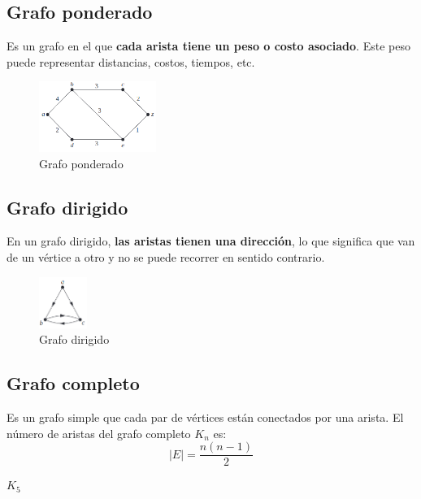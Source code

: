 \documentclass{article}
\begin{document}
\newpage

\subsection{Grafo ponderado}
Es un grafo en el que \textbf{cada arista tiene un peso o costo asociado}. Este peso puede representar distancias, costos, tiempos, etc.

\begin{figure}[h]
    \centering
    \includegraphics[width=0.34\textwidth]{img-t4/img_168_10.png}
    \caption{Grafo ponderado}
\end{figure}

\subsection{Grafo dirigido}
En un grafo dirigido, \textbf{las aristas tienen una dirección}, lo que significa que van de un vértice a otro y no se puede recorrer en sentido contrario. 

\begin{figure}[h]
    \centering
    \includegraphics[width=0.14\textwidth]{img-t4/img_131_39.png}
    \caption{Grafo dirigido}
\end{figure}

\subsection{Grafo completo}
Es un grafo simple que cada par de vértices están conectados por una arista. El número de aristas del grafo completo $K_n$ es: 
$$|E| = \frac{n(n-1)}{2}$$

    \begin{center}
    $K_5$
    \end{center}
\end{document}
